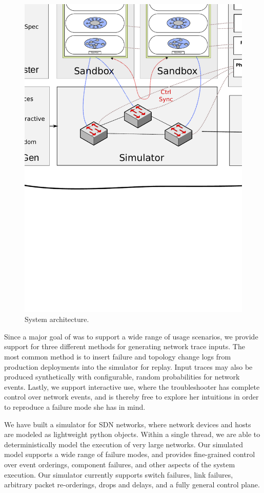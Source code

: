 \begin{figure}[!t]
  \centering
  \includegraphics[width=0.8\textwidth{}]{../diagrams/architecture/architecture.pdf}
  \caption{System architecture. }
  \label{fig:system}
\end{figure}

 Since a major goal of \projectname{} was
to support a wide range of usage scenarios, %
we provide support for three different methods for generating network trace
inputs. The most common method is to insert failure and topology change logs
from production deployments into the simulator for replay. Input traces may
also be produced synthetically with configurable, random probabilities for
network events. Lastly, we support interactive use, where the troubleshooter
has complete control over network events, and is thereby free to explore her
intuitions in order to reproduce a failure mode she has in mind.

 We have built a simulator for SDN networks,
where network devices and hosts are modeled as lightweight python objects.
 Within a single thread, we
are able to deterministically model the execution of very large networks.
Our simulated model supports a wide
range of failure modes, and provides fine-grained control over event
orderings, component failures, and other aspects of the system execution. Our
simulator currently supports switch failures, link failures, arbitrary packet
re-orderings, drops and delays, and a fully general control plane.

